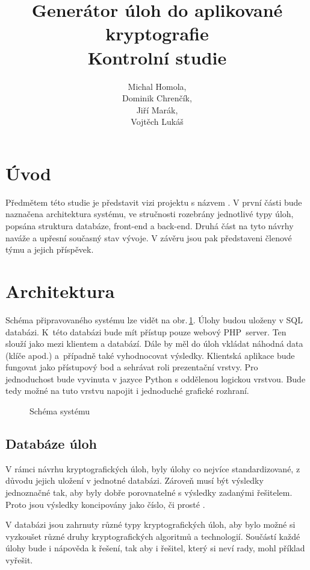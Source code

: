 \documentclass[titlepage]{article}
\title{Generátor úloh do aplikované kryptografie\\Kontrolní studie}
\author{Michal Homola,\\Dominik Chrenčík,\\Jiří Marák,\\Vojtěch Lukáš}
\begin{document}
\maketitle

\tableofcontents

\section*{Úvod}
Předmětem této studie je představit vizi projektu s názvem . V první části bude naznačena architektura systému, ve stručnosti rozebrány jednotlivé typy úloh, popsána struktura databáze, front-end a back-end. Druhá část na tyto návrhy naváže a upřesní současný stav vývoje. V závěru jsou pak představeni členové týmu a jejich příspěvek. 

\section{Architektura}
Schéma připravovaného systému lze vidět na obr.\,\ref{fig:sys}. Úlohy budou uloženy v SQL databázi. K~této databázi bude mít přístup pouze webový PHP~server. Ten slouží jako  mezi klientem a databází. Dále by měl do úloh vkládat náhodná data (klíče apod.) a~případně také vyhodnocovat výsledky. 
Klientská aplikace bude fungovat jako přístupový bod a sehrávat roli prezentační vrstvy. Pro jednoduchost bude vyvinuta v jazyce Python s oddělenou logickou vrstvou. Bude tedy možné na tuto vrstvu napojit i jednoduché grafické rozhraní. 
\begin{figure}[h!]
    \centering
        
    \caption{Schéma systému}
    \label{fig:sys}
\end{figure}




\subsection{Databáze úloh}\label{sec:databaze_uloh}

V rámci návrhu kryptografických úloh, byly úlohy co nejvíce standardizované, z důvodu jejich uložení v jednotné databázi. Zároveň musí být výsledky jednoznačné tak, aby byly dobře porovnatelné s výsledky zadanými řešitelem. Proto jsou výsledky koncipovány jako číslo, či prosté .      

 V databázi jsou zahrnuty různé typy kryptografických úloh, aby bylo možné si vyzkoušet různé druhy kryptografických algoritmů a technologií. Součástí každé úlohy bude i nápověda k řešení, tak aby i řešitel, který si neví rady, mohl příklad vyřešit.
\end{document}
